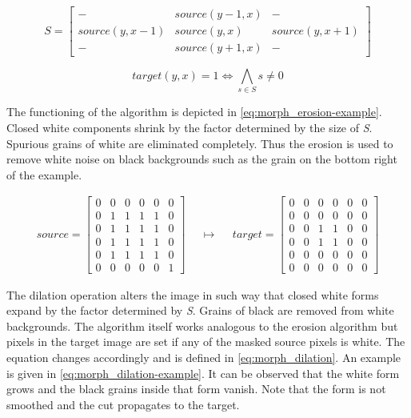 \documentclass{report}
\begin{document}
\begin{equation}\label{eq:morph_mask}
  S = \begin{bmatrix}

    -              & source(y-1, x) & -              \\
    source(y, x-1) & source(y, x)   & source(y, x+1) \\
    -              & source(y+1, x) & -

  \end{bmatrix}
\end{equation}

\begin{equation}\label{eq:morph_erosion}
  target(y, x) = 1 \iff \bigwedge_{s \in S} s \neq 0
\end{equation}

The functioning of the algorithm is depicted in
\ref{eq:morph_erosion-example}. Closed white components shrink by the
factor determined by the size of \textit{S}. Spurious grains of white
are eliminated completely. Thus the erosion is used to remove white
noise on black backgrounds such as the grain on the bottom right of
the example.

\begin{align}\label{eq:morph_erosion-example}
  source = \begin{bmatrix}
    0 & 0 & 0 & 0 & 0 & 0 \\
    0 & 1 & 1 & 1 & 1 & 0 \\
    0 & 1 & 1 & 1 & 1 & 0 \\
    0 & 1 & 1 & 1 & 1 & 0 \\
    0 & 1 & 1 & 1 & 1 & 0 \\
    0 & 0 & 0 & 0 & 0 & 1
  \end{bmatrix}
  & &
  \mapsto
  & &
  target = \begin{bmatrix}
    0 & 0 & 0 & 0 & 0 & 0 \\
    0 & 0 & 0 & 0 & 0 & 0 \\
    0 & 0 & 1 & 1 & 0 & 0 \\
    0 & 0 & 1 & 1 & 0 & 0 \\
    0 & 0 & 0 & 0 & 0 & 0 \\
    0 & 0 & 0 & 0 & 0 & 0
  \end{bmatrix}
\end{align}

The dilation operation alters the image in such way that closed white
forms expand by the factor determined by \textit{S}. Grains of black
are removed from white backgrounds. The algorithm itself works
analogous to the erosion algorithm but pixels in the target image are
set if any of the masked source pixels is white. The equation changes
accordingly and is defined in \ref{eq:morph_dilation}. An example is
given in \ref{eq:morph_dilation-example}. It can be observed that the
white form grows and the black grains inside that form vanish. Note
that the form is not smoothed and the cut propagates to the target.
\end{document}
